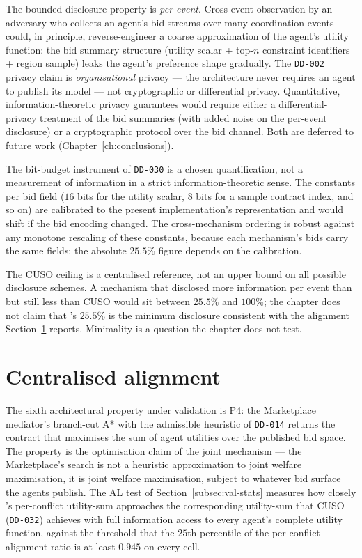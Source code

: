 The bounded-disclosure property is \emph{per event}. Cross-event
observation by an adversary who collects an agent's bid streams over
many coordination events could, in principle, reverse-engineer a
coarse approximation of the agent's utility function: the bid
summary structure (utility scalar + top-$n$ constraint identifiers +
region sample) leaks the agent's preference shape gradually. The
\texttt{DD-002} privacy claim is \emph{organisational} privacy --- the
architecture never requires an agent to publish its model --- not
cryptographic or differential privacy. Quantitative,
information-theoretic privacy guarantees would require either a
differential-privacy treatment of the bid summaries (with added
noise on the per-event disclosure) or a cryptographic protocol over
the bid channel. Both are deferred to future work
(Chapter~\ref{ch:conclusions}).

The bit-budget instrument of \texttt{DD-030} is a chosen
quantification, not a measurement of information in a strict
information-theoretic sense. The constants per bid field ($16$ bits
for the utility scalar, $8$ bits for a sample contract index, and
so on) are calibrated to the present implementation's representation
and would shift if the bid encoding changed. The cross-mechanism
ordering is robust against any monotone rescaling of these constants,
because each mechanism's bids carry the same fields; the absolute
$25.5\%$ figure depends on the calibration.

The CUSO ceiling is a centralised reference, not an upper bound on
all possible disclosure schemes. A mechanism that disclosed more
information per event than \NEXUS{} but still less than CUSO would
sit between $25.5\%$ and $100\%$; the chapter does not claim that
\NEXUS{}'s $25.5\%$ is the minimum disclosure consistent with the
alignment Section~\ref{sec:val-alignment} reports. Minimality is a
question the chapter does not test.

\section{Centralised alignment}
\label{sec:val-alignment}

The sixth architectural property under validation is P4: the
Marketplace mediator's branch-cut A* with the admissible heuristic
of \texttt{DD-014} returns the contract that maximises the sum of
agent utilities over the published bid space. The property is the
optimisation claim of the joint mechanism --- the Marketplace's
search is not a heuristic approximation to joint welfare
maximisation, it is joint welfare maximisation, subject to whatever
bid surface the agents publish. The AL test of
Section~\ref{subsec:val-stats} measures how closely \NEXUS{}'s
per-conflict utility-sum approaches the corresponding utility-sum
that CUSO (\texttt{DD-032}) achieves with full information access to
every agent's complete utility function, against the threshold that
the $25$th percentile of the per-conflict alignment ratio is at
least $0.945$ on every cell.


